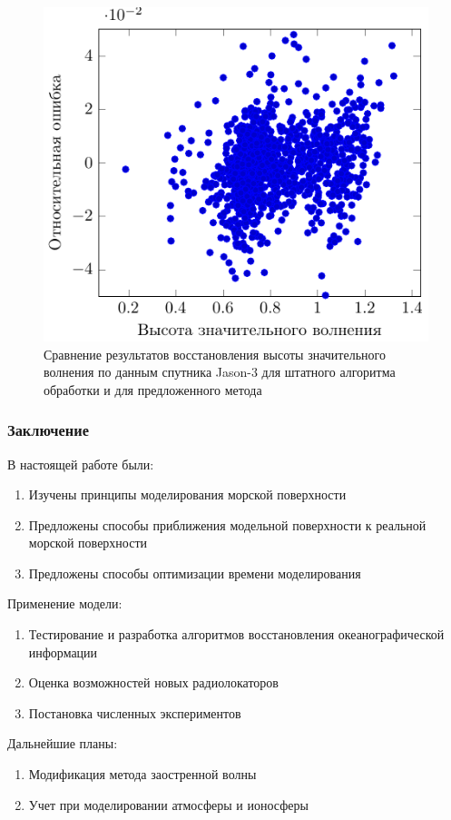 \documentclass[10pt,pdf,hyperref={unicode}, dvipsnames]{beamer}
\begin{document}
\begin{frame}[t]{}
    \begin{figure}[h]
        \centering
        \includegraphics[width=0.6\linewidth]{fig/retracking/compare}
        \caption{Сравнение результатов восстановления высоты значительного
        волнения по данным спутника Jason-3 для штатного алгоритма обработки
    и для предложенного метода}
    \end{figure}
\end{frame}
\begin{frame}[t]
	\frametitle{Заключение}
	\vfill
    В настоящей работе были:
		\begin{enumerate}
			\item Изучены принципы моделирования морской поверхности

			\item Предложены способы приближения модельной поверхности к
                реальной морской поверхности 

			\item Предложены способы оптимизации времени моделирования
		\end{enumerate}
		\vfill

    Применение модели:

	\begin{enumerate}
		\item Тестирование и разработка алгоритмов восстановления океанографической информации
		\item Оценка возможностей новых радиолокаторов
		\item Постановка численных экспериментов
	\end{enumerate}
	\vfill

    Дальнейшие планы: 
	\begin{enumerate}
		\item Модификация метода заостренной волны
        \item Учет при моделировании атмосферы и ионосферы
	\end{enumerate}
	\vfill
    
\end{frame}
\end{document}
